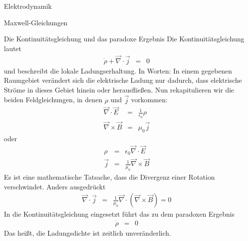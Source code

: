 \begin{chapter}{\titlestr}
\begin{section}{Elektrodynamik}
\begin{subsection}{Maxwell-Gleichungen}
\begin{subsubsection}{Die Kontinuitätsgleichung und das paradoxe Ergebnis}
Die Kontinuitätsgleichung lautet
\begin{eqnarray}
\label{continuity_eqn}
\dot{\rho} + \vec{\nabla}\cdot\vec{j} &=& 0
\end{eqnarray}
und beschreibt die lokale Ladungserhaltung. In Worten: In einem gegebenen Raumgebiet verändert sich die elektrische Ladung nur dadurch, dass elektrische Ströme in dieses Gebiet hinein oder herausfließen.
Nun rekapitulieren wir die beiden Feldgleichungen, in denen $\rho$ und $\vec{j}$ vorkommen:
\begin{eqnarray*}
\vec{\nabla}\cdot\vec{E} &=& \frac{1}{\epsilon_0}\rho\\
\vec{\nabla}\times\vec{B} &=& \mu_0\vec{j}
\end{eqnarray*}
oder
\begin{eqnarray*}
\rho &=& \epsilon_0\vec{\nabla}\cdot\vec{E}\\
\vec{j} &=& \frac{1}{\mu_0}\vec{\nabla}\times\vec{B}
\end{eqnarray*}
Es ist eine mathematische Tatsache, dass die Divergenz einer Rotation verschwindet. Anders ausgedrückt
\begin{eqnarray*}
\vec{\nabla}\cdot \vec{j} &=& \frac{1}{\mu_0}\vec{\nabla}\cdot \left(\vec{\nabla}\times\vec{B}\right) = 0
\end{eqnarray*}
In die Kontinuitätsgleichung eingesetzt führt das zu dem paradoxen Ergebnis
\begin{eqnarray*}
\dot{\rho} &=& 0
\end{eqnarray*}
Das heißt, die Ladungsdichte ist zeitlich unveränderlich.
\end{subsubsection}


\end{subsection}
\end{section}
\end{chapter}
